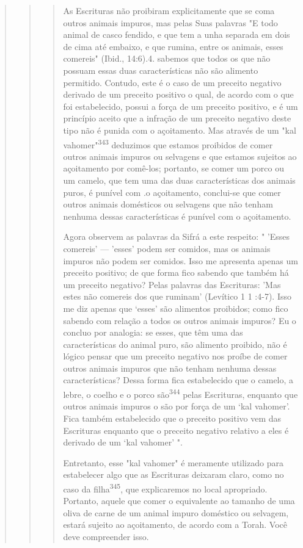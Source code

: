 \begin{quote}
\begin{quote}
\begin{quote}
As Escrituras não proibiram explicitamente que se coma outros ani­mais
impuros, mas pelas Suas palavras "E todo animal de casco fendido, e que
tem a unha separada em dois de cima até embaixo, e que rumina, entre os
ani­mais, esses comereis" (Ibid.,
14:6).4. sabemos que todos os que
não possuam essas duas características não são alimento permitido.
Contudo, este é o caso de um preceito negativo derivado de um preceito
positivo o qual, de acordo com o que foi estabelecido, possui a força de
um preceito positivo, e é um princípio aceito que a infração de um
preceito negativo deste tipo não é puni­da com o açoitamento. Mas
através de um "kal vahomer"\textsuperscript{343} deduzimos que estamos
proibidos de comer outros animais impuros ou selvagens e que esta­mos
sujeitos ao açoitamento por comê-los; portanto, se comer um porco ou um
camelo, que tem uma das duas características dos animais puros, é
puní­vel com .o açoitamento, conclui-se que comer outros animais
domésticos ou selvagens que não tenham nenhuma dessas características é
punível com o açoitamento.

Agora observem as palavras da Sifrá a este respeito: " 'Esses come­reis'
--- 'esses' podem ser comidos, mas os animais impuros não podem ser
co­midos. Isso me apresenta apenas um preceito positivo; de que forma
fico sa­bendo que também há um preceito negativo? Pelas palavras das
Escrituras: 'Mas estes não comereis dos que ruminam' (Levítico 1 1
:4-7). Isso me diz apenas que `esses' são alimentos proibidos; como fico
sabendo com relação a todos os ou­tros animais impuros? Eu o concluo por
analogia: se esses, que têm uma das características do animal puro, são
alimento proibido, não é lógico pensar que um preceito negativo nos
proíbe de comer outros animais impuros que não tenham nenhuma dessas
características? Dessa forma fica estabelecido que o camelo, a lebre, o
coelho e o porco são\textsuperscript{344} pelas Escrituras, enquanto que
ou­tros animais impuros o são por força de um `kal vahomer'. Fica também
estabe­lecido que o preceito positivo vem das Escrituras enquanto que o
preceito ne­gativo relativo a eles é derivado de um `kal vahomer' ".

Entretanto, esse "kal vahomer" é meramente utilizado para esta­belecer
algo que as Escrituras deixaram claro, como no caso da
filha\textsuperscript{345}, que explicaremos no local apropriado.
Portanto, aquele que comer o equivalente ao tamanho de uma oliva de
carne de um animal impuro doméstico ou selva­gem, estará sujeito ao
açoitamento, de acordo com a Torah. Você deve com­preender isso.
\end{quote}


\end{quote}
\end{quote}
